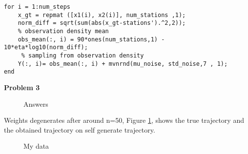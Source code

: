 \documentclass[a4paper]{article}
\begin{document}
\begin{lstlisting}
for i = 1:num_steps
    x_gt = repmat ([x1(i), x2(i)], num_stations ,1); 
    norm_diff = sqrt(sum(abs(x_gt-stations').^2,2));
    % observation density mean
    obs_mean(:, i) = 90*ones(num_stations,1) - 10*eta*log10(norm_diff); 
     % sampling from observation density
    Y(:, i)= obs_mean(:, i) + mvnrnd(mu_noise, std_noise,7 , 1); 
end
\end{lstlisting}

\textbf{Problem 3}\\

\begin{figure}%
    \centering
    \qquad
    \qquad
    \caption{Answers}%
    \label{fig:example}%
\end{figure}


Weights degenerates after around n=50, Figure \ref{fig:example}, shows the true trajectory and the obtained trajectory on self generate trajectory.  


\begin{figure}%
    \centering
    \qquad
    \qquad
    \caption{My data}%
    \label{fig:my}%
\end{figure}
\end{document}
